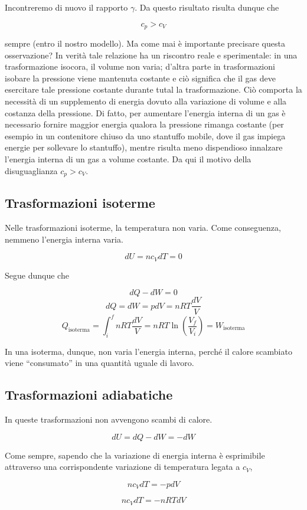 \noindent Incontreremo di nuovo il rapporto $\gamma$. Da questo risultato
risulta dunque che

\[ c_p > c_V \]

\noindent sempre (entro il nostro modello). Ma come mai è importante precisare
questa osservazione? In verità tale relazione ha un riscontro reale
e sperimentale: in una trasformazione isocora, il volume non varia;
d'altra parte in trasformazioni isobare la pressione viene mantenuta
costante e ciò significa che il gas deve esercitare tale pressione
costante durante tutal la trasformazione. Ciò comporta la necessità di un
supplemento di energia dovuto alla variazione di volume e alla costanza
della pressione. Di fatto, per aumentare l'energia interna di un
gas è necessario fornire maggior energia qualora la pressione rimanga
costante (per esempio in un contenitore chiuso da uno stantuffo mobile,
dove il gas impiega energie per sollevare lo stantuffo), mentre risulta
meno dispendioso innalzare l'energia interna di un gas a volume
costante. Da qui il motivo della disuguaglianza $c_p > c_V$.

\subsection{Trasformazioni isoterme}
Nelle trasformazioni isoterme, la temperatura non varia. Come
conseguenza, nemmeno l'energia interna varia.

\[ dU = nc_VdT = 0 \]

Segue dunque che

\[ dQ - dW = 0 \]
\[ dQ = dW = pdV = nRT\frac{dV}{V} \]
\[ Q_\text{isoterma} = \int_{i}^{f}nRT\frac{dV}{V} = nRT\ln\left(\frac{V_f}{V_i}\right) = W_\text{isoterma} \]

In una isoterma, dunque, non varia l'energia interna, perché il calore
scambiato viene ``consumato'' in una quantità uguale di lavoro.

\subsection{Trasformazioni adiabatiche}
In queste trasformazioni non avvengono scambi di calore.

\[ dU = dQ - dW = -dW \]

Come sempre, sapendo che la variazione di energia interna è esprimibile
attraverso una corrispondente variazione di temperatura legata a $c_V$,

\[ nc_VdT = -pdV \]

\[ nc_VdT = -nRTdV \]

